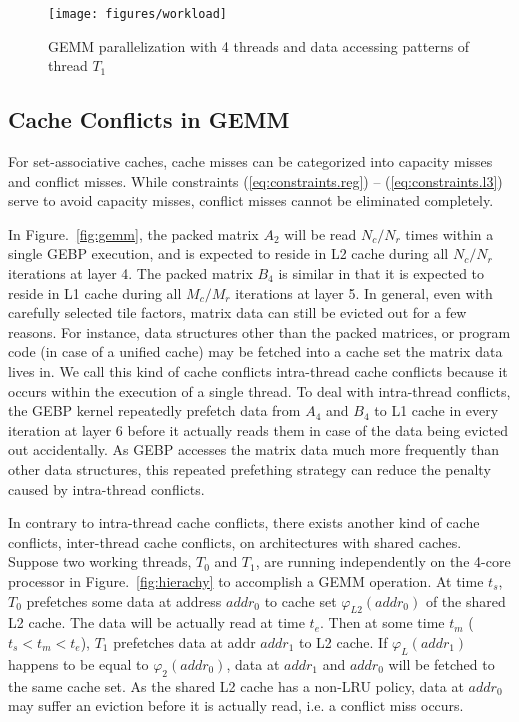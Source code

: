 \begin{figure}[t]
  \centering
  \texttt{[image: figures/workload]}
  \caption{GEMM parallelization with 4 threads and data accessing patterns of thread $T_1$}
  \label{fig:workload}
\end{figure}

\subsection{Cache Conflicts in GEMM}\label{subsec:cache-conflicts}

For set-associative caches, cache misses can be categorized
into capacity misses and conflict misses.
While constraints (\ref{eq:constraints.reg}) -- (\ref{eq:constraints.l3})
serve to avoid capacity misses,
conflict misses cannot be eliminated completely.

In Figure.~\ref{fig:gemm}, the packed matrix $A_2$
will be read $N_c/N_r$ times within a single GEBP execution,
and is expected to reside in L2 cache during all $N_c/N_r$ iterations at layer 4.
The packed matrix $B_4$ is similar in that it is expected to
reside in L1 cache during all $M_c/M_r$ iterations at layer 5.
In general, even with carefully selected tile factors,
matrix data can still be evicted out for a few reasons.
For instance, data structures other than the packed matrices,
or program code (in case of a unified cache) may be fetched into a
cache set the matrix data lives in.
We call this kind of cache conflicts intra-thread cache conflicts
because it occurs within the execution of a single thread.
To deal with intra-thread conflicts,
the GEBP kernel repeatedly prefetch data from $A_4$ and $B_4$ to L1 cache
in every iteration at layer 6 before it actually reads them in case of
the data being evicted out accidentally.
As GEBP accesses the matrix data much more frequently than other
data structures, this repeated prefething strategy
can reduce the penalty caused by intra-thread conflicts.

In contrary to intra-thread cache conflicts,
there exists another kind of cache conflicts,
inter-thread cache conflicts, on architectures with shared caches.
Suppose two working threads, $T_0$ and $T_1$, are running independently
on the 4-core processor in Figure.~\ref{fig:hierachy}
to accomplish a GEMM operation.
At time $t_s$, $T_0$ prefetches some data at address $addr_0$
to cache set $\varphi_{L2}(addr_0)$ of the shared L2 cache.
The data will be actually read at time $t_e$.
Then at some time $t_m$ ($t_s < t_m < t_e$),
$T_1$ prefetches data at addr $addr_1$ to L2 cache.
If $\varphi_L(addr_1)$ happens to be equal to $\varphi_2(addr_0)$,
data at $addr_1$ and $addr_0$ will be fetched to the same cache set.
As the shared L2 cache has a non-LRU policy,
data at $addr_0$ may suffer an eviction before it is actually read,
i.e. a conflict miss occurs.

